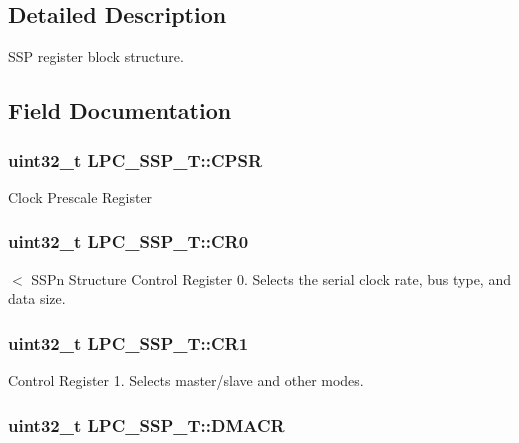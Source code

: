 \subsection{Detailed Description}
S\-S\-P register block structure. 

\subsection{Field Documentation}
\hypertarget{structLPC__SSP__T_a48e7161fc6e6b91bd724a17df5435141}{
\subsubsection[{C\-P\-S\-R}]{ uint32\-\_\-t L\-P\-C\-\_\-\-S\-S\-P\-\_\-\-T\-::\-C\-P\-S\-R}}\label{structLPC__SSP__T_a48e7161fc6e6b91bd724a17df5435141}
Clock Prescale Register \hypertarget{structLPC__SSP__T_af8ad155254cb659608f4c1c6bd83b62b}{
\subsubsection[{C\-R0}]{ uint32\-\_\-t L\-P\-C\-\_\-\-S\-S\-P\-\_\-\-T\-::\-C\-R0}}\label{structLPC__SSP__T_af8ad155254cb659608f4c1c6bd83b62b}
$<$ S\-S\-Pn Structure Control Register 0. Selects the serial clock rate, bus type, and data size. \hypertarget{structLPC__SSP__T_a648b740833659e86e8be3a8f6c17147c}{
\subsubsection[{C\-R1}]{ uint32\-\_\-t L\-P\-C\-\_\-\-S\-S\-P\-\_\-\-T\-::\-C\-R1}}\label{structLPC__SSP__T_a648b740833659e86e8be3a8f6c17147c}
Control Register 1. Selects master/slave and other modes. \hypertarget{structLPC__SSP__T_a6a74b0cbac37f424e198ccef9a208d65}{
\subsubsection[{D\-M\-A\-C\-R}]{ uint32\-\_\-t L\-P\-C\-\_\-\-S\-S\-P\-\_\-\-T\-::\-D\-M\-A\-C\-R}}\label{structLPC__SSP__T_a6a74b0cbac37f424e198ccef9a208d65}
